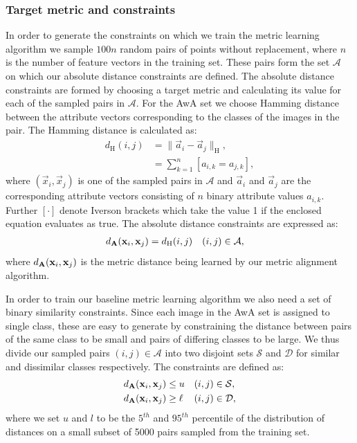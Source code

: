 \subsubsection{Target metric and constraints}

In order to generate the constraints on which we train the metric learning algorithm we sample $100 n$ random pairs of points without replacement, where $n$ is the number of feature vectors in the training set. These pairs form the set $\mathcal{A}$ on which our absolute distance constraints are defined. The absolute distance constraints are formed by choosing a target metric and calculating its value for each of the sampled pairs in $\mathcal{A}$. For the \ac{AwA} set we choose Hamming distance between the attribute vectors corresponding to the classes of the images in the pair.   The Hamming distance is calculated as:
\begin{align}
d_{\text{H}}(i, j) &= \|\vec{a}_i - \vec{a}_j\|_{\text{H}}, \\
 &= \sum_{k=1}^{n} \left[ a_{i,k} = a_{j,k} \right],
\end{align}
where $(\vec{x}_i, \vec{x}_j)$ is one of the sampled pairs in $\mathcal{A}$ and $\vec{a}_i$ and $\vec{a}_j$ are the corresponding attribute vectors consisting of $n$ binary attribute values $a_{i,k}$. Further $[ \cdot ]$ denote Iverson brackets which take the value 1 if the enclosed equation evaluates as true. The absolute distance constraints are expressed as:
\begin{align}
d_{\mathbf{A}}(\mathbf{x}_i, \mathbf{x}_j) &= d_{\text{H}}(i, j) & (i, j) &\in \mathcal{A},
\end{align}
where $d_{\mathbf{A}}(\mathbf{x}_i, \mathbf{x}_j)$ is the metric distance being learned by our metric alignment algorithm.

In order to train our baseline metric learning algorithm we also need a set of binary similarity constraints. Since each image in the \ac{AwA} set is assigned to single class, these are easy to generate by constraining the distance between pairs of the same class to be small and pairs of differing classes to be large. We thus divide our sampled pairs $(i,j) \in \mathcal{A}$ into two disjoint sets $\mathcal{S}$ and $\mathcal{D}$ for similar and dissimilar classes respectively. The constraints are defined as:
\begin{align}
d_{\mathbf{A}}(\mathbf{x}_i, \mathbf{x}_j) &\leq u & (i, j) &\in \mathcal{S}, \\
d_{\mathbf{A}}(\mathbf{x}_i, \mathbf{x}_j) &\geq \ell & (i, j) &\in \mathcal{D},
\end{align}
where we set $u$ and $l$ to be the $5^{th}$ and $95^{th}$ percentile of the distribution of distances on a small subset of 5000 pairs sampled from the training set.

